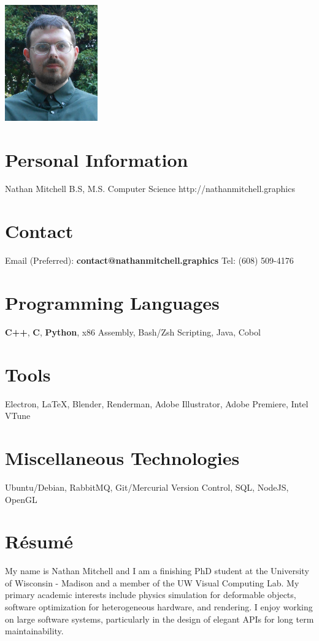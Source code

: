 \documentclass{cv-style}     %
\begin{document}
\lastupdated

\begin{aside}
\includegraphics[width=4cm]{NMitchell_Portrait}
%
\section{Personal Information}
Nathan Mitchell
B.S, M.S. Computer Science
http://nathanmitchell.graphics
\section{Contact}
Email (Preferred):
{\footnotesize \bf contact@nathanmitchell.graphics}
Tel:
(608) 509-4176
\section{Programming Languages}
\textbf{C++}, \textbf{C}, \textbf{Python}, x86 Assembly, Bash/Zsh Scripting,
Java, Cobol
%
\section{Tools}
Electron, LaTeX, Blender, Renderman, Adobe
Illustrator, Adobe Premiere, Intel VTune
\section{Miscellaneous Technologies}
Ubuntu/Debian, RabbitMQ,
Git/Mercurial Version
Control, SQL, NodeJS, OpenGL
%
\end{aside}
\vspace{0.2cm}
\section{R\'{e}sum\'{e}}
\vspace{-0.2cm} My name is Nathan Mitchell and I
am a finishing PhD student at the University of
Wisconsin - Madison and a member of the UW Visual
Computing Lab. My primary academic interests
include physics simulation for deformable objects,
software optimization for heterogeneous hardware,
and rendering. I enjoy working on large software
systems, particularly in the design of elegant
APIs for long term maintainability.
\end{document}
